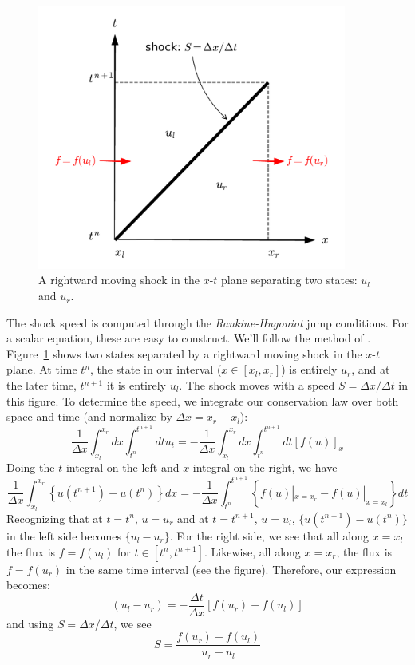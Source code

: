 \begin{figure}[t]
\centering
\includegraphics[width=4in]{rh}
\caption[Rankine-Hugoniot conditions]{\label{fig:rh} A rightward moving shock in the $x$-$t$
   plane separating two states: $u_l$ and $u_r$.}
\end{figure}

The shock speed is computed through the {\em Rankine-Hugoniot} jump
conditions.  For a scalar equation, these are easy to construct.
We'll follow the method of \cite{leveque:2002}.  Figure~\ref{fig:rh}
shows two states separated by a rightward moving shock in the $x$-$t$
plane.  At time $t^n$, the state in our interval ($x \in [x_l,x_r]$)
is entirely $u_r$, and at the later time, $t^{n+1}$ it is entirely
$u_l$.  The shock moves with a speed $S = \Delta x/\Delta t$ in this
figure.  To determine the speed, we integrate our conservation law over
both space and time (and normalize by $\Delta x = x_r - x_l$):
\begin{equation}
\frac{1}{\Delta x} \int_{x_l}^{x_r} dx \int_{t^n}^{t^{n+1}} dt u_t = 
  - \frac{1}{\Delta x} \int_{x_l}^{x_r} dx \int_{t^n}^{t^{n+1}} dt \left [ f(u) \right ]_x
\end{equation}
Doing the $t$ integral on the left and $x$ integral on the right, we have
\begin{equation}
\frac{1}{\Delta x} \int_{x_l}^{x_r}\left \{ u(t^{n+1}) - u(t^n) \right \} dx = 
  - \frac{1}{\Delta x} \int_{t^n}^{t^{n+1}} \left \{ f(u) |_{x=x_r} - f(u) |_{x=x_l} \right \} dt
\end{equation}
Recognizing that at $t=t^n$, $u = u_r$ and at $t=t^{n+1}$, $u = u_l$,
$\{ u(t^{n+1}) - u(t^n) \}$ in the left side becomes $\{ u_l -u_r \}$.
For the right side, we see that all along $x=x_l$ the flux is $f =
f(u_l)$ for $t\in [t^n, t^{n+1}]$.  Likewise, all along $x=x_r$, the
flux is $f = f(u_r)$ in the same time interval (see the figure).
Therefore, our expression becomes:
\begin{equation}
(u_l - u_r) = -\frac{\Delta t}{\Delta x} \left [ f(u_r) - f(u_l)\right ]
\end{equation}
and using $S = \Delta x/\Delta t$, we see
\begin{equation}
S = \frac{f(u_r) - f(u_l)}{u_r - u_l}
\end{equation}

